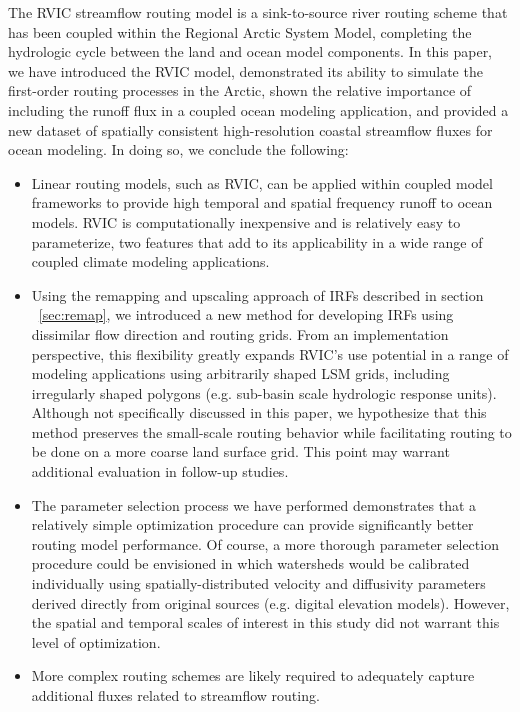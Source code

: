 \documentclass[jgrga, draft]{agutex}
\begin{document}
\begin{article}
The RVIC streamflow routing model is a sink-to-source river routing scheme that has been coupled within the Regional Arctic System Model, completing the hydrologic cycle between the land and ocean model components.
In this paper, we have introduced the RVIC model, demonstrated its ability to simulate the first-order routing processes in the Arctic, shown the relative importance of including the runoff flux in a coupled ocean modeling application, and provided a new dataset of spatially consistent high-resolution coastal streamflow fluxes for ocean modeling.
In doing so, we conclude the following:

\begin{itemize}[leftmargin=+.5in]
  \item Linear routing models, such as RVIC, can be applied within coupled model frameworks to provide high temporal and spatial frequency runoff to ocean models.
  RVIC is computationally inexpensive and is relatively easy to parameterize, two features that add to its applicability in a wide range of coupled climate modeling applications.
  \item Using the remapping and upscaling approach of IRFs described in section ~\ref{sec:remap}, we introduced a new method for developing IRFs using dissimilar flow direction and routing grids.
  From an implementation perspective, this flexibility greatly expands RVIC's use potential in a range of modeling applications using arbitrarily shaped LSM grids, including irregularly shaped polygons (e.g. sub-basin scale hydrologic response units).
  Although not specifically discussed in this paper, we hypothesize that this method preserves the small-scale routing behavior while facilitating routing to be done on a more coarse land surface grid.
  This point may warrant additional evaluation in follow-up studies.
  \item The parameter selection process we have performed demonstrates that a relatively simple optimization procedure can provide significantly better routing model performance.
  Of course, a more thorough parameter selection procedure could be envisioned in which watersheds would be calibrated individually using spatially-distributed velocity and diffusivity parameters derived directly from original sources (e.g. digital elevation models).
  However, the spatial and temporal scales of interest in this study did not warrant this level of optimization.
  \item More complex routing schemes are likely required to adequately capture additional fluxes related to streamflow routing.

\end{itemize}
\end{article}
\end{document}
